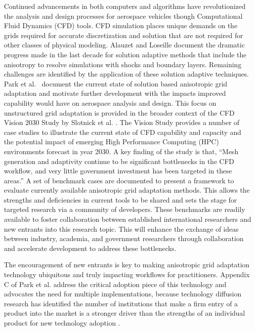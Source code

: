 \documentclass[3p,times,procedia,number]{elsarticle}
\begin{document}
Continued advancements in both computers and algorithms
have revolutionized the analysis and design processes for
aerospace vehicles though Computational Fluid Dynamics (CFD) tools.
CFD simulation places unique demands on the grids required for
accurate discretization and solution that are not required
for other classes of physical modeling.
Alauzet and Loseille \cite{alauzet-loseille-decade-aniso-adapt-cfd}
document the dramatic progress made in the last decade
for solution adaptive methods that include the anisotropy to
resolve simulations with shocks and boundary layers.
Remaining challenges are identified
by the application of these solution adaptive techniques.
Park et al. \cite{park-unstruct-adapt-status-cfd2030}~document
the current state of solution based anisotropic
grid adaptation and motivate further development with
the impacts improved capability would have on
aerospace analysis and design.
This focus on unstructured grid adaptation
is provided in the broader context of the
CFD Vision 2030 Study by Slotnick et al. \cite{cfd-vision-2030}.
The Vision Study provides a number of case studies
to illustrate the current state of CFD capability and capacity and the
potential impact of emerging High Performance Computing (HPC)
environments forecast in year 2030.
A key finding of the study is that,
``Mesh generation and adaptivity continue to be significant bottlenecks
in the CFD workflow, and very little government investment has been targeted
in these areas.''\cite{cfd-vision-2030}
A set of benchmark cases are documented to present a framework to evaluate
currently available anisotropic grid adaptation methods.
This allows the strengths and deficiencies in current tools to be shared
and sets the stage for targeted research via a community of developers.
These benchmarks are readily available to foster collaboration
between established international researchers and new
entrants into this research topic.
This will enhance the exchange of ideas between
industry, academia, and government researchers through collaboration
and accelerate development to address these bottlenecks.

The encouragement of new entrants is key to making
anisotropic grid adaptation technology ubiquitous and truly impacting
workflows for practitioners.
Appendix C of Park et al. \cite{park-unstruct-adapt-status-cfd2030}
address the critical adoption piece of this technology and
advocates the need for multiple implementations,
because technology diffusion research has identified the
number of institutions that make a firm entry of a product
into the market is a stronger driver than the strengths of an individual
product for new technology
adoption \cite{agarwal-bayus-market-evo-takeoff-innovation}.
\end{document}
